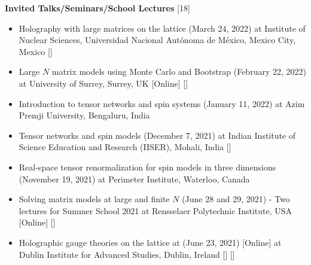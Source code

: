 \vspace{2mm} 
\textcolor{alizarin}{\textbf{\fontsize{10}{38} \bfseries Invited Talks/Seminars/School Lectures} [18]}

\begin{itemize}

 \item Holography with large matrices on the lattice (March 24, 2022) at Institute of Nuclear Sciences, 
 Universidad Nacional Aut\'{o}noma de M\'{e}xico, Mexico City, Mexico   
  []
 \vspace{1mm}%
 
\item Large $N$ matrix models using Monte Carlo and Bootstrap
 (February 22, 2022) at University of Surrey, Surrey, UK [Online]  
 []
 \vspace{1mm} 
 
 \item Introduction to tensor networks and spin systems 
 (January 11, 2022) at Azim Premji University, Bengaluru, India  \vspace{1mm} 
 
 \item Tensor networks and spin models 
 (December 7, 2021) at Indian Institute of Science Education and Research (IISER), Mohali, India 
 []  \vspace{1mm} 
 
  \item Real-space tensor renormalization for spin models in three dimensions 
 (November 19, 2021) at Perimeter Institute, Waterloo, Canada \vspace{1mm}  
 
 \item Solving matrix models at large and finite $N$ (June 28 and 29, 2021) - Two lectures for 
Summer School 2021 at Rensselaer Polytechnic Institute, USA [Online]  
  [] \vspace{1mm} 
 
 \item Holographic gauge theories on the lattice at 
 (June 23, 2021) [Online] at Dublin Institute for Advanced Studies, Dublin, Ireland 
  []  [] 
  \vspace{1mm} 
  

\end{itemize}
